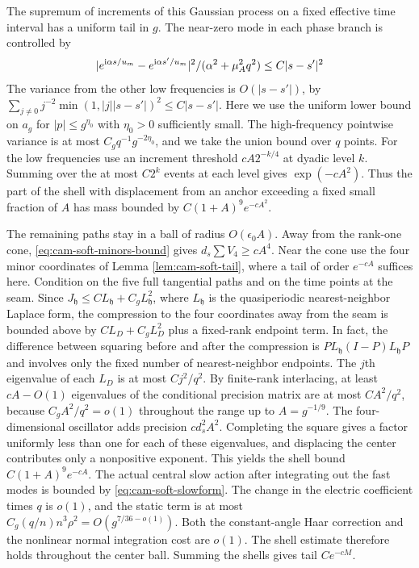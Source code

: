 \documentclass[11pt,a4paper]{article}
\numberwithin{equation}{section}
\newcommand{\hper}{\mathfrak h}
\begin{document}
The supremum of increments of this Gaussian process on a fixed effective time interval has a uniform tail in \(g\). The near-zero mode in each phase branch is controlled by
\[
 |e^{{\rm i}\alpha s/u_m}-e^{{\rm i}\alpha s'/u_m}|^2/
                  (\alpha^2+\mu_A^2 q^2)\le C|s-s'|^2
\]
The variance from the other low frequencies is \(O(|s-s'|)\), by
\(\sum_{j\ne0} j^{-2}\min(1,|j||s-s'|)^2\le C|s-s'|\).
Here we use the uniform lower bound on \(a_g\) for \(|p|\le g^{\eta_0}\) with \(\eta_0>0\) sufficiently small. The high-frequency pointwise variance is at most \(C_gq^{-1}g^{-2\eta_0}\), and we take the union bound over \(q\) points. For the low frequencies use an increment threshold \(c A 2^{-k/4}\) at dyadic level \(k\). Summing over the at most \(C2^k\) events at each level gives \(\exp(-cA^2)\). Thus the part of the shell with displacement from an anchor exceeding a fixed small fraction of \(A\) has mass bounded by \(C(1+A)^9e^{-cA^2}\).

The remaining paths stay in a ball of radius \(O(\epsilon_0 A)\). Away from the rank-one cone, \eqref{eq:cam-soft-minors-bound} gives \(d_s \sum V_4\ge c A^4\). Near the cone use the four minor coordinates of Lemma \ref{lem:cam-soft-tail}, where a tail of order \(e^{-cA}\) suffices here. Condition on the five full tangential paths and on the time points at the seam. Since
\(J_\hper \le C L_\hper +C_g L_\hper ^2\), where \(L_\hper \) is the quasiperiodic nearest-neighbor Laplace form, the compression to the four coordinates away from the seam is bounded above by
\(C L_D+C_g L_D^2\) plus a fixed-rank endpoint term. In fact, the difference between squaring before and after the compression is
\(P L_\hper (I-P)L_\hper  P\) and involves only the fixed number of nearest-neighbor endpoints. The \(j\)th eigenvalue of each \(L_D\) is at most \(Cj^2/q^2\). By finite-rank interlacing, at least \(cA-O(1)\) eigenvalues of the conditional precision matrix are at most \(CA^2/q^2\), because \(C_g A^2/q^2=o(1)\) throughout the range up to \(A=g^{-1/9}\). The four-dimensional oscillator adds precision \(c d_s^2 A^2\). Completing the square gives a factor uniformly less than one for each of these eigenvalues, and displacing the center contributes only a nonpositive exponent. This yields the shell bound \(C(1+A)^9e^{-cA}\). The actual central slow action after integrating out the fast modes is bounded by \eqref{eq:cam-soft-slowform}. The change in the electric coefficient times \(q\) is \(o(1)\), and the static term is at most
\(C_g(q/n)n^3\rho^2=O(g^{7/36-o(1)})\). Both the constant-angle Haar correction and the nonlinear normal integration cost are \(o(1)\). The shell estimate therefore holds throughout the center ball. Summing the shells gives tail \(Ce^{-cM}\).
\end{document}
